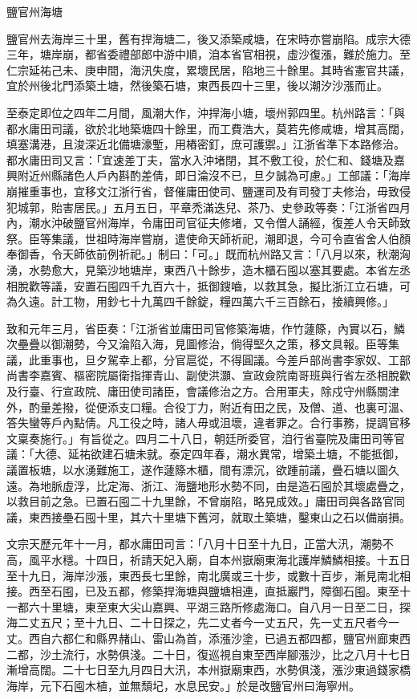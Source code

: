 \begin{pinyinscope}
 鹽官州海塘



 鹽官州去海岸三十里，舊有捍海塘二，後又添築咸塘，在宋時亦嘗崩陷。成宗大德三年，塘岸崩，都省委禮部郎中游中順，洎本省官相視，虛沙復漲，難於施力。至仁宗延祐己未、庚申間，海汛失度，累壞民居，陷地三十餘里。其時省憲官共議，宜於州後北門添築土塘，然後築石塘，東西長四十三里，後以潮汐沙漲而止。



 至泰定即位之四年二月間，風潮大作，沖捍海小塘，壞州郭四里。杭州路言：「與都水庸田司議，欲於北地築塘四十餘里，而工費浩大，莫若先修咸塘，增其高闊，填塞溝港，且浚深近北備塘濠塹，用樁密釘，庶可護禦。」江浙省準下本路修治。都水庸田司又言：「宜速差丁夫，當水入沖堵閉，其不敷工役，於仁和、錢塘及嘉興附近州縣諸色人戶內斟酌差倩，即日淪沒不已，旦夕誠為可慮。」工部議：「海岸崩摧重事也，宜移文江浙行省，督催庸田使司、鹽運司及有司發丁夫修治，毋致侵犯城郭，貽害居民。」五月五日，平章禿滿迭兒、茶乃、史參政等奏：「江浙省四月內，潮水沖破鹽官州海岸，令庸田司官征夫修堵，又令僧人誦經，復差人令天師致祭。臣等集議，世祖時海岸嘗崩，遣使命天師祈祀，潮即退，今可令直省舍人伯顏奉御香，令天師依前例祈祀。」制曰：「可。」既而杭州路又言：「八月以來，秋潮洶湧，水勢愈大，見築沙地塘岸，東西八十餘步，造木櫃石囤以塞其要處。本省左丞相脫歡等議，安置石囤四千九百六十，抵御鎪嚙，以救其急，擬比浙江立石塘，可為久遠。計工物，用鈔七十九萬四千餘錠，糧四萬六千三百餘石，接續興修。」



 致和元年三月，省臣奏：「江浙省並庸田司官修築海塘，作竹蘧篨，內實以石，鱗次壘疊以御潮勢，今又淪陷入海，見圖修治，倘得堅久之策，移文具報。臣等集議，此重事也，旦夕駕幸上都，分官扈從，不得圓議。今差戶部尚書李家奴、工部尚書李嘉賓、樞密院屬衛指揮青山、副使洪灝、宣政僉院南哥班與行省左丞相脫歡及行臺、行宣政院、庸田使司諸臣，會議修治之方。合用軍夫，除戍守州縣關津外，酌量差撥，從便添支口糧。合役丁力，附近有田之民，及僧、道、也裏可溫、答失蠻等戶內點倩。凡工役之時，諸人毋或沮壞，違者罪之。合行事務，提調官移文稟奏施行。」有旨從之。四月二十八日，朝廷所委官，洎行省臺院及庸田司等官議：「大德、延祐欲建石塘未就。泰定四年春，潮水異常，增築土塘，不能抵御，議置板塘，以水湧難施工，遂作蘧篨木櫃，間有漂沉，欲踵前議，疊石塘以圖久遠。為地脈虛浮，比定海、浙江、海鹽地形水勢不同，由是造石囤於其壞處疊之，以救目前之急。已置石囤二十九里餘，不曾崩陷，略見成效。」庸田司與各路官同議，東西接壘石囤十里，其六十里塘下舊河，就取土築塘，鑿東山之石以備崩損。



 文宗天歷元年十一月，都水庸田司言：「八月十日至十九日，正當大汛，潮勢不高，風平水穩。十四日，祈請天妃入廟，自本州嶽廟東海北護岸鱗鱗相接。十五日至十九日，海岸沙漲，東西長七里餘，南北廣或三十步，或數十百步，漸見南北相接。西至石囤，已及五都，修築捍海塘與鹽塘相連，直抵巖門，障御石囤。東至十一都六十里塘，東至東大尖山嘉興、平湖三路所修處海口。自八月一日至二日，探海二丈五尺；至十九日、二十日探之，先二丈者今一丈五尺，先一丈五尺者今一丈。西自六都仁和縣界赭山、雷山為首，添漲沙塗，已過五都四都，鹽官州廊東西二都，沙土流行，水勢俱淺。二十日，復巡視自東至西岸腳漲沙，比之八月十七日漸增高闊。二十七日至九月四日大汛，本州嶽廟東西，水勢俱淺，漲沙東過錢家橋海岸，元下石囤木植，並無頹圮，水息民安。」於是改鹽官州曰海寧州。




\end{pinyinscope}
